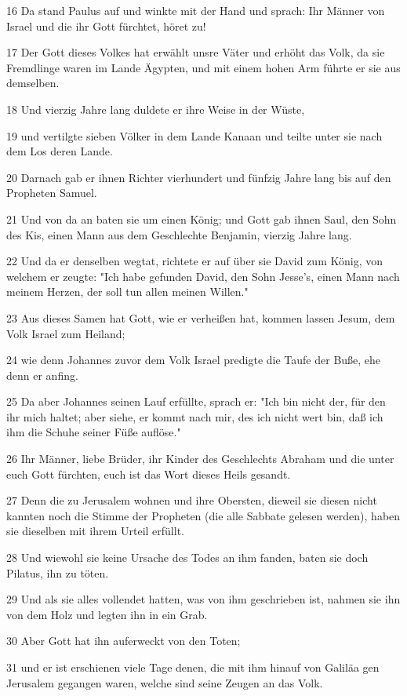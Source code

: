 \par 16 Da stand Paulus auf und winkte mit der Hand und sprach: Ihr Männer von Israel und die ihr Gott fürchtet, höret zu!
\par 17 Der Gott dieses Volkes hat erwählt unsre Väter und erhöht das Volk, da sie Fremdlinge waren im Lande Ägypten, und mit einem hohen Arm führte er sie aus demselben.
\par 18 Und vierzig Jahre lang duldete er ihre Weise in der Wüste,
\par 19 und vertilgte sieben Völker in dem Lande Kanaan und teilte unter sie nach dem Los deren Lande.
\par 20 Darnach gab er ihnen Richter vierhundert und fünfzig Jahre lang bis auf den Propheten Samuel.
\par 21 Und von da an baten sie um einen König; und Gott gab ihnen Saul, den Sohn des Kis, einen Mann aus dem Geschlechte Benjamin, vierzig Jahre lang.
\par 22 Und da er denselben wegtat, richtete er auf über sie David zum König, von welchem er zeugte: "Ich habe gefunden David, den Sohn Jesse's, einen Mann nach meinem Herzen, der soll tun allen meinen Willen."
\par 23 Aus dieses Samen hat Gott, wie er verheißen hat, kommen lassen Jesum, dem Volk Israel zum Heiland;
\par 24 wie denn Johannes zuvor dem Volk Israel predigte die Taufe der Buße, ehe denn er anfing.
\par 25 Da aber Johannes seinen Lauf erfüllte, sprach er: "Ich bin nicht der, für den ihr mich haltet; aber siehe, er kommt nach mir, des ich nicht wert bin, daß ich ihm die Schuhe seiner Füße auflöse."
\par 26 Ihr Männer, liebe Brüder, ihr Kinder des Geschlechts Abraham und die unter euch Gott fürchten, euch ist das Wort dieses Heils gesandt.
\par 27 Denn die zu Jerusalem wohnen und ihre Obersten, dieweil sie diesen nicht kannten noch die Stimme der Propheten (die alle Sabbate gelesen werden), haben sie dieselben mit ihrem Urteil erfüllt.
\par 28 Und wiewohl sie keine Ursache des Todes an ihm fanden, baten sie doch Pilatus, ihn zu töten.
\par 29 Und als sie alles vollendet hatten, was von ihm geschrieben ist, nahmen sie ihn von dem Holz und legten ihn in ein Grab.
\par 30 Aber Gott hat ihn auferweckt von den Toten;
\par 31 und er ist erschienen viele Tage denen, die mit ihm hinauf von Galiläa gen Jerusalem gegangen waren, welche sind seine Zeugen an das Volk.
